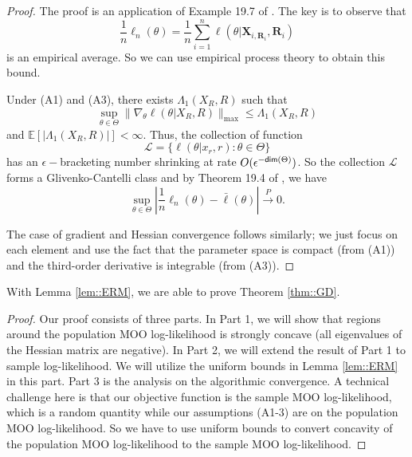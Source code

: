 \documentclass[aos, preprint]{imsart}
\theoremstyle{plain}
\theoremstyle{definition}
\let\hat\widehat
\newcommand{\E}{\mbox{$\mathbb{E}$}}
\newcommand{\bX}{\mathbf{X}}
\newcommand{\bR}{\mathbf{R}}
\begin{document}
\begin{appendix}
\begin{proof}
The proof is an application of Example 19.7 of \cite{van2000asymptotic}. 
The key is to observe that 
$$
\frac{1}{n}\ell_n(\theta)  = \frac{1}{n}\sum_{i=1}^n \ell(\theta|\bX_{i,\bR_i},\bR_i)
$$
is an empirical average. 
So we can use empirical process theory to obtain this bound.

Under (A1) and (A3), there exists $\Lambda_1(X_R,R)$ such that 
$$
\sup_{\theta \in \Theta}\|\nabla_\theta \ell(\theta|X_R,R)\|_{\max} \leq \Lambda_1(X_R,R)
$$
and $\E[|\Lambda_1(X_R,R)|]<\infty$.
Thus, 
the collection of function 
$$
\mathcal{L} = \{ \ell(\theta|x_r,r): \theta\in\Theta\}
$$
has an $\epsilon-$bracketing number shrinking at rate $O(\epsilon^{-{\sf dim}(\Theta)})$. 
So the collection $\mathcal{L}$ forms a Glivenko-Cantelli class and by Theorem 19.4 of \cite{van2000asymptotic},
we have 
$$
\sup_{\theta \in \Theta} \left|\frac{1}{n}\ell_n(\theta) - \bar \ell(\theta)\right| \overset{P}{\rightarrow}0.
$$

The case of gradient and Hessian convergence follows similarly; we just focus on each element 
and use the fact that the parameter space is compact (from (A1)) and the third-order derivative is integrable (from (A3)).

\end{proof}



With Lemma \ref{lem::ERM}, we are able to prove Theorem \ref{thm::GD}.

\begin{proof}
Our proof consists of three parts.
In Part 1, we will show that regions around the population MOO log-likelihood is strongly concave (all eigenvalues of the Hessian matrix
are negative).
In Part 2, we will extend the result of Part 1 to sample log-likelihood.
We will utilize the uniform bounds in 
Lemma \ref{lem::ERM} in this part.
Part 3 is the analysis on the algorithmic convergence.
A technical challenge here is that our objective function is the sample MOO log-likelihood,
which is a random quantity while our assumptions (A1-3) are on the population MOO log-likelihood.
So we have to use uniform bounds to convert concavity of the population MOO log-likelihood to
the sample MOO log-likelihood.


\end{proof}
\end{appendix}
\end{document}
